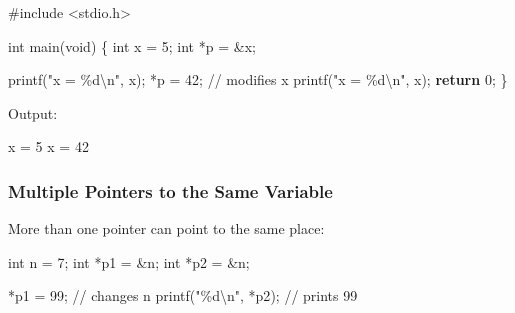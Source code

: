 \documentclass[
  letterpaper,
  DIV=11,
  numbers=noendperiod]{scrreprt}
\newenvironment{Shaded}{\begin{snugshade}}{\end{snugshade}}
\newcommand{\CommentTok}[1]{\textcolor[rgb]{0.37,0.37,0.37}{#1}}
\newcommand{\ControlFlowTok}[1]{\textcolor[rgb]{0.00,0.23,0.31}{\textbf{#1}}}
\newcommand{\DataTypeTok}[1]{\textcolor[rgb]{0.68,0.00,0.00}{#1}}
\newcommand{\DecValTok}[1]{\textcolor[rgb]{0.68,0.00,0.00}{#1}}
\newcommand{\ExtensionTok}[1]{\textcolor[rgb]{0.00,0.23,0.31}{#1}}
\newcommand{\ImportTok}[1]{\textcolor[rgb]{0.00,0.46,0.62}{#1}}
\newcommand{\NormalTok}[1]{\textcolor[rgb]{0.00,0.23,0.31}{#1}}
\newcommand{\OperatorTok}[1]{\textcolor[rgb]{0.37,0.37,0.37}{#1}}
\newcommand{\PreprocessorTok}[1]{\textcolor[rgb]{0.68,0.00,0.00}{#1}}
\newcommand{\SpecialCharTok}[1]{\textcolor[rgb]{0.37,0.37,0.37}{#1}}
\newcommand{\StringTok}[1]{\textcolor[rgb]{0.13,0.47,0.30}{#1}}
\begin{document}
\begin{Shaded}
\begin{Highlighting}[]
\PreprocessorTok{\#include }\ImportTok{\textless{}stdio.h\textgreater{}}

\DataTypeTok{int}\NormalTok{ main}\OperatorTok{(}\DataTypeTok{void}\OperatorTok{)} \OperatorTok{\{}
    \DataTypeTok{int}\NormalTok{ x }\OperatorTok{=} \DecValTok{5}\OperatorTok{;}
    \DataTypeTok{int} \OperatorTok{*}\NormalTok{p }\OperatorTok{=} \OperatorTok{\&}\NormalTok{x}\OperatorTok{;}

\NormalTok{    printf}\OperatorTok{(}\StringTok{"x = }\SpecialCharTok{\%d\textbackslash{}n}\StringTok{"}\OperatorTok{,}\NormalTok{ x}\OperatorTok{);}
    \OperatorTok{*}\NormalTok{p }\OperatorTok{=} \DecValTok{42}\OperatorTok{;}        \CommentTok{// modifies x}
\NormalTok{    printf}\OperatorTok{(}\StringTok{"x = }\SpecialCharTok{\%d\textbackslash{}n}\StringTok{"}\OperatorTok{,}\NormalTok{ x}\OperatorTok{);}
    \ControlFlowTok{return} \DecValTok{0}\OperatorTok{;}
\OperatorTok{\}}
\end{Highlighting}
\end{Shaded}

Output:

\begin{Shaded}
\begin{Highlighting}[]
\ExtensionTok{x}\NormalTok{ = 5}
\ExtensionTok{x}\NormalTok{ = 42}
\end{Highlighting}
\end{Shaded}

\subsubsection{Multiple Pointers to the Same
Variable}\label{multiple-pointers-to-the-same-variable}

More than one pointer can point to the same place:

\begin{Shaded}
\begin{Highlighting}[]
\DataTypeTok{int}\NormalTok{ n }\OperatorTok{=} \DecValTok{7}\OperatorTok{;}
\DataTypeTok{int} \OperatorTok{*}\NormalTok{p1 }\OperatorTok{=} \OperatorTok{\&}\NormalTok{n}\OperatorTok{;}
\DataTypeTok{int} \OperatorTok{*}\NormalTok{p2 }\OperatorTok{=} \OperatorTok{\&}\NormalTok{n}\OperatorTok{;}

\OperatorTok{*}\NormalTok{p1 }\OperatorTok{=} \DecValTok{99}\OperatorTok{;}   \CommentTok{// changes n}
\NormalTok{printf}\OperatorTok{(}\StringTok{"}\SpecialCharTok{\%d\textbackslash{}n}\StringTok{"}\OperatorTok{,} \OperatorTok{*}\NormalTok{p2}\OperatorTok{);}  \CommentTok{// prints 99}
\end{Highlighting}
\end{Shaded}
\end{document}
